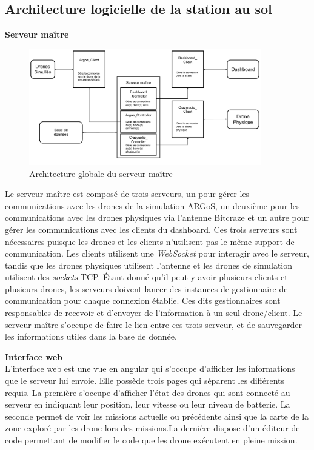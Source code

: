 \documentclass{mistcoursedoc}
\begin{document}
\subsection{Architecture logicielle de la station au sol}
\textbf{Serveur maître}\\
\begin{figure}[h!]
  \centering\includegraphics[width=0.9\textwidth]{architecture-serveur.pdf}
  \caption{Architecture globale du serveur maître}
\end{figure}

Le serveur maître est composé de trois serveurs, un pour gérer les communications avec les drones de la simulation ARGoS, un deuxième pour les communications avec les drones physiques via l'antenne Bitcraze et un autre pour gérer les communications avec les clients du dashboard. Ces trois serveurs sont nécessaires puisque les drones et les clients n’utilisent pas le même support de communication. Les clients utilisent une \emph{WebSocket} pour interagir avec le serveur, tandis que les drones physiques utilisent l'antenne et les drones de simulation utilisent des \emph{sockets} TCP. Étant donné qu'il peut y avoir plusieurs clients et plusieurs drones, les serveurs doivent lancer des instances de gestionnaire de communication pour chaque connexion établie. Ces dits gestionnaires sont responsables de recevoir et d’envoyer de l’information à un seul drone/client. Le serveur maître s'occupe de faire le lien entre ces trois serveur, et de sauvegarder les informations utiles dans la base de donnée.

\textbf{Interface web}\\

L'interface web est une vue en angular qui s'occupe d'afficher les informations que le serveur lui envoie. Elle possède trois pages qui séparent les différents requis. La première s'occupe d'afficher l'état des drones qui sont connecté au serveur en indiquant leur position, leur vitesse ou leur niveau de batterie. La seconde permet de voir les missions actuelle ou précédente ainsi que la carte de la zone exploré par les drone lors des missions.La dernière dispose d'un éditeur de code permettant de modifier le code que les drone exécutent en pleine mission.
\end{document}
